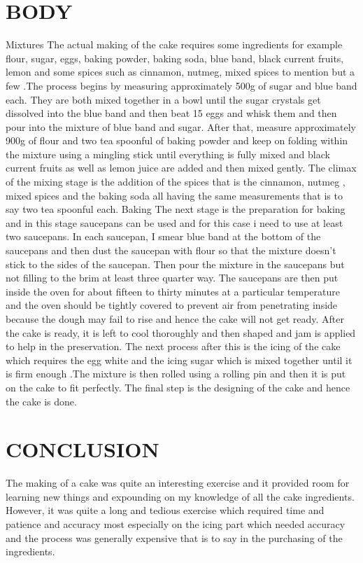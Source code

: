\documentclass[14pt]{article}
\begin{document}
\section{BODY}
Mixtures
The actual making of the cake requires some ingredients for example flour, sugar, eggs, baking powder, baking soda, blue band, black current fruits, lemon and some spices such as cinnamon, nutmeg, mixed spices to mention but a few .The process begins by measuring approximately 500g of sugar and blue band each. They are both mixed together in a bowl until the sugar crystals get dissolved into the blue band and then beat 15 eggs and whisk them and then pour into the mixture of blue band and sugar. After that, measure approximately 900g of flour and two tea spoonful of baking powder  and keep on folding within the mixture using a mingling stick until everything is fully mixed and black current fruits as well as lemon juice are added and then mixed gently. The climax of the mixing stage is the addition of the spices that is the cinnamon, nutmeg , mixed spices and the baking soda all having the same measurements that is to say two tea spoonful each.
Baking
 The next stage is the preparation for baking and in this stage saucepans can be used and for this case i need to use at least two saucepans. In each saucepan, I smear blue band at the bottom of the saucepans and then dust the saucepan with flour so that the mixture doesn’t stick to the sides of the saucepan. Then pour the mixture in the saucepans but not filling to the brim at least three quarter way. The saucepans are then put inside the oven for about fifteen to thirty minutes at a particular temperature and the oven should be tightly covered to prevent air from penetrating inside because the dough may fail to rise and hence the cake will not get ready. After the cake is ready, it is left to cool thoroughly and then shaped and jam is applied to help in the preservation. The next process after this is the icing of the cake which requires the egg white and the icing sugar which is mixed together until it is firm enough .The mixture is then rolled using a rolling pin and then it is put on the cake to fit perfectly. The final step is the designing of the cake and hence the cake is done.

\section{CONCLUSION}
The making of a cake was quite an interesting exercise and it provided room for learning new things and expounding on my knowledge of all the cake ingredients. 
However, it was quite a long and tedious exercise which required time and patience and accuracy most especially on the icing part which needed accuracy and the process was generally expensive that is to say in the purchasing of the ingredients.
\end{document}
